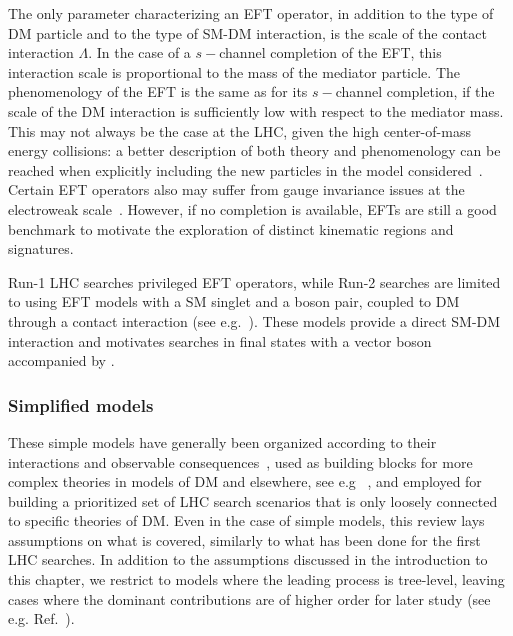 The only parameter characterizing an EFT operator, in addition to the type of DM particle and to the type of SM-DM interaction, is the scale of the contact interaction $\Lambda$. In the case of a $s-$channel completion of the EFT, this interaction scale is proportional to the mass of the mediator particle. The phenomenology of the EFT is the same as for its $s-$channel completion, if the scale of the DM interaction is sufficiently low with respect to the mediator mass. This may not always be the case at the LHC, given the high center-of-mass energy collisions: a better description of both theory and phenomenology can be reached when explicitly including the new particles in the model considered~\cite{Buchmueller:2013dya,DeSimone:2016fbz,Berlin:2014cfa}. Certain EFT operators also may suffer from gauge invariance issues at the electroweak scale~\cite{Bell:2015sza}. However, if no completion is available, EFTs are still a good benchmark to motivate the exploration of distinct kinematic regions and signatures. %

\begin{marginnote}[]
\end{marginnote}

Run-1 LHC searches privileged EFT operators, while Run-2 searches are limited to using EFT models with a SM singlet and a boson pair, coupled to DM through a contact interaction (see e.g.~\cite{Petrov:2013nia,Berlin:2014cfa}). These models provide a direct SM-DM interaction and motivates searches in final states with a vector boson accompanied by \MET. 

\subsubsection{Simplified models}
\label{sub:simplifiedModels}
 
These simple models have generally been organized according to their interactions and observable consequences~\cite{Abercrombie:2015wmb}, used as building blocks for more complex theories in models of DM and elsewhere, see e.g ~\cite{Alwall:2008ag, Agrawal:2010fh, Alves:2011wf, Choudhury:2015lha, Gutschow:2012pw}, and employed for building a prioritized set of LHC search scenarios that is only loosely connected to specific theories of DM. 
Even in the case of simple models, this review lays assumptions on what is covered, similarly to what has been done for the first LHC searches. In addition to the assumptions discussed in the introduction to this chapter, we restrict to models where the leading process is tree-level, leaving cases where the dominant contributions are of higher order for later study (see e.g. Ref.~\cite{Godbole:2015gma}). 


